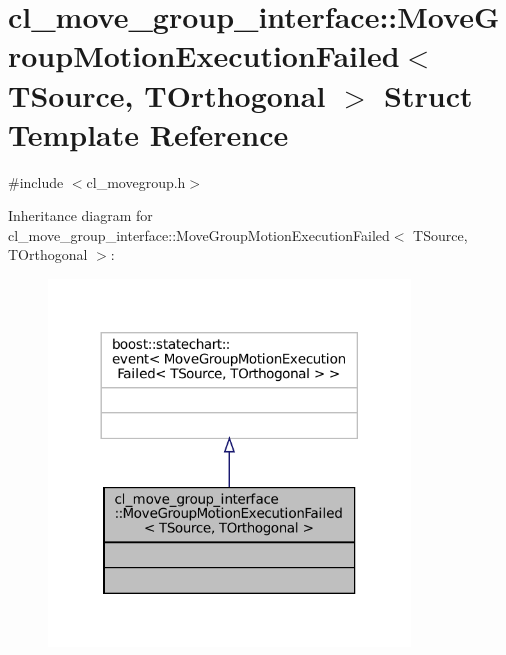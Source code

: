 \hypertarget{structcl__move__group__interface_1_1MoveGroupMotionExecutionFailed}{}\section{cl\+\_\+move\+\_\+group\+\_\+interface\+:\+:Move\+Group\+Motion\+Execution\+Failed$<$ T\+Source, T\+Orthogonal $>$ Struct Template Reference}
\label{structcl__move__group__interface_1_1MoveGroupMotionExecutionFailed}


{\ttfamily \#include $<$cl\+\_\+movegroup.\+h$>$}



Inheritance diagram for cl\+\_\+move\+\_\+group\+\_\+interface\+:\+:Move\+Group\+Motion\+Execution\+Failed$<$ T\+Source, T\+Orthogonal $>$\+:
\nopagebreak
\begin{figure}[H]
\begin{center}
\leavevmode
\includegraphics[width=272pt]{structcl__move__group__interface_1_1MoveGroupMotionExecutionFailed__inherit__graph}
\end{center}
\end{figure}



